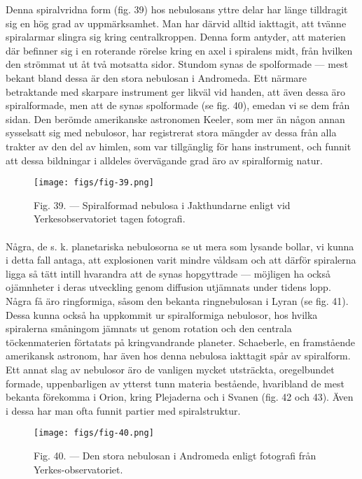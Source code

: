 \documentclass[a4paper, 12pt, oneside, swedish]{article}
\begin{document}
Denna spiralvridna form (fig. 39) hos nebulosans yttre delar har länge tilldragit sig en hög grad av uppmärksamhet. Man har därvid alltid iakttagit, att tvänne spiralarmar slingra sig kring centralkroppen. Denna form antyder, att materien där befinner sig i en roterande rörelse kring en axel i spiralens midt, från hvilken den strömmat ut åt två motsatta sidor. Stundom synas de spolformade --- mest bekant bland dessa är den stora nebulosan i Andromeda. Ett närmare betraktande med skarpare instrument ger likväl vid handen, att även dessa äro spiralformade, men att de synas spolformade (se fig. 40), emedan vi se dem från sidan. Den berömde amerikanske astronomen Keeler, som mer än någon annan sysselsatt sig med nebulosor, har registrerat stora mängder av dessa från alla trakter av den del av himlen, som var tillgänglig för hans instrument, och funnit att dessa bildningar i alldeles övervägande grad äro av spiralformig natur.

\begin{figure}[H]
\centering
\texttt{[image: figs/fig-39.png]}
\caption{Fig. 39. --- Spiralformad nebulosa i Jakthundarne enligt vid Yerkesobservatoriet tagen fotografi.}
\end{figure}
\paragraph{}
Några, de s. k. planetariska nebulosorna se ut mera som lysande bollar, vi kunna i detta fall antaga, att explosionen varit mindre våldsam och att därför spiralerna ligga så tätt intill hvarandra att de synas hopgyttrade --- möjligen ha också ojämnheter i deras utveckling genom diffusion utjämnats under tidens lopp. Några få äro ringformiga, såsom den bekanta ringnebulosan i Lyran (se fig. 41). Dessa kunna också ha uppkommit ur spiralformiga nebulosor, hos hvilka spiralerna småningom jämnats ut genom rotation och den centrala töckenmaterien förtatats på kringvandrande planeter. Schaeberle, en framstående amerikansk astronom, har även hos denna nebulosa iakttagit spår av spiralform. Ett annat slag av nebulosor äro de vanligen mycket utsträckta, oregelbundet formade, uppenbarligen av ytterst tunn materia bestående, hvaribland de mest bekanta förekomma i Orion, kring Plejaderna och i Svanen (fig. 42 och 43). Även i dessa har man ofta funnit partier med spiralstruktur.

\begin{figure}[H]
\centering
\texttt{[image: figs/fig-40.png]}
\caption{Fig. 40. --- Den stora nebulosan i Andromeda enligt fotografi från Yerkes-observatoriet.}
\end{figure}
\end{document}
